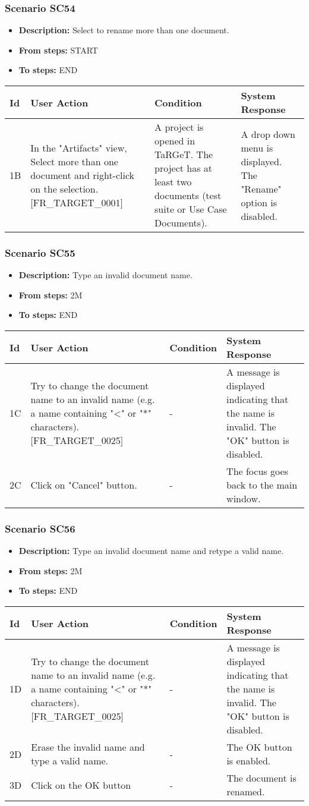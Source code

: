 \documentclass[a4paper,11pt]{article}
\newcommand{\bl}{\\ \hline}
\begin{document}
\subsubsection*{Scenario SC54}
\begin{itemize}
\item {\bf Description:} Select to rename more than one document.
\item {\bf From steps:} START
\item {\bf To steps:} END
\end{itemize}
\begin{tabular}{|p{0.4in}|p{1.5in}|p{1.5in}|p{1.5in}|}
\hline
Id & User Action & Condition & System Response \bl 
1B & In the "Artifacts" view, Select more than one document and
						right-click on the selection. [FR_TARGET_0001] & A project is opened in TaRGeT. The project has at least
						two documents (test suite or Use Case Documents). & A drop down menu is displayed. The "Rename" option is
						disabled.\bl
\end{tabular}
\subsubsection*{Scenario SC55}
\begin{itemize}
\item {\bf Description:} Type an invalid document name.
\item {\bf From steps:} 2M
\item {\bf To steps:} END
\end{itemize}
\begin{tabular}{|p{0.4in}|p{1.5in}|p{1.5in}|p{1.5in}|}
\hline
Id & User Action & Condition & System Response \bl 
1C & Try to change the document name to an invalid name (e.g. a
						name containing "<" or "*" characters). [FR_TARGET_0025]
					 & - & A message is displayed indicating that the name is
						invalid. The "OK" button is disabled.\bl
2C & Click on "Cancel" button. & - & The focus goes back to the main window.\bl
\end{tabular}
\subsubsection*{Scenario SC56}
\begin{itemize}
\item {\bf Description:} Type an invalid document name and retype a valid name.
				
\item {\bf From steps:} 2M
\item {\bf To steps:} END
\end{itemize}
\begin{tabular}{|p{0.4in}|p{1.5in}|p{1.5in}|p{1.5in}|}
\hline
Id & User Action & Condition & System Response \bl 
1D & Try to change the document name to an invalid name (e.g. a
						name containing "<" or "*" characters). [FR_TARGET_0025]
					 & - & A message is displayed indicating that the name is
						invalid. The "OK" button is disabled.\bl
2D & Erase the invalid name and type a valid name. & - & The OK button is enabled.\bl
3D & Click on the OK button & - & The document is renamed.\bl
\end{tabular}
\end{document}
